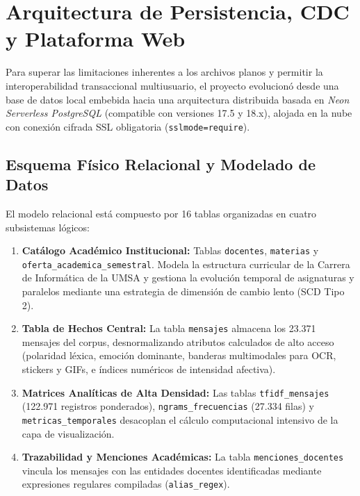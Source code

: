 \section{Arquitectura de Persistencia, CDC y Plataforma Web}
\label{sec:arquitectura_datos}

Para superar las limitaciones inherentes a los archivos planos y permitir la interoperabilidad transaccional multiusuario, el proyecto evolucionó desde una base de datos local embebida hacia una arquitectura distribuida basada en \emph{Neon Serverless PostgreSQL} (compatible con versiones 17.5 y 18.x), alojada en la nube con conexión cifrada SSL obligatoria (\texttt{sslmode=require}).

\subsection{Esquema Físico Relacional y Modelado de Datos}

El modelo relacional está compuesto por 16 tablas organizadas en cuatro subsistemas lógicos:
\begin{enumerate}[label=\alph*)]
  \item \textbf{Catálogo Académico Institucional:} Tablas \texttt{docentes}, \texttt{materias} y \texttt{oferta\_}\allowbreak\texttt{academica\_}\allowbreak\texttt{semestral}. Modela la estructura curricular de la Carrera de Informática de la UMSA y gestiona la evolución temporal de asignaturas y paralelos mediante una estrategia de dimensión de cambio lento (SCD Tipo 2).
  \item \textbf{Tabla de Hechos Central:} La tabla \texttt{mensajes} almacena los 23.371 mensajes del corpus, desnormalizando atributos calculados de alto acceso (polaridad léxica, emoción dominante, banderas multimodales para OCR, stickers y GIFs, e índices numéricos de intensidad afectiva).
  \item \textbf{Matrices Analíticas de Alta Densidad:} Las tablas \texttt{tfidf\_mensajes} (122.971 registros ponderados), \texttt{ngrams\_frecuencias} (27.334 filas) y \texttt{metricas\_temporales} desacoplan el cálculo computacional intensivo de la capa de visualización.
  \item \textbf{Trazabilidad y Menciones Académicas:} La tabla \texttt{menciones\_docentes} vincula los mensajes con las entidades docentes identificadas mediante expresiones regulares compiladas (\texttt{alias\_regex}).
\end{enumerate}



